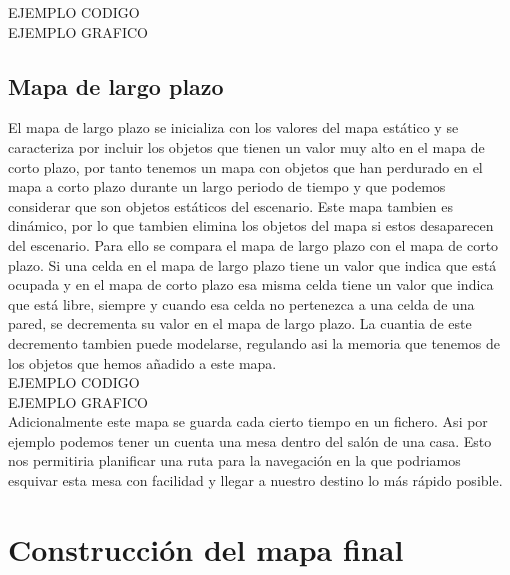 {EJEMPLO CODIGO}\\
{EJEMPLO GRAFICO}\\

\subsection{Mapa de largo plazo}
El mapa de largo plazo se inicializa con los valores del mapa estático y se caracteriza por incluir los objetos que tienen un valor muy alto en el mapa de corto plazo, por tanto tenemos un mapa con objetos que han perdurado en el mapa a corto plazo durante un largo periodo de tiempo y que podemos considerar que son objetos estáticos del escenario. 
Este mapa tambien es dinámico, por lo que tambien elimina los objetos del mapa si estos desaparecen del escenario. Para ello se compara el mapa de largo plazo con el mapa de corto plazo. Si una celda en el mapa de largo plazo tiene un valor que indica que está ocupada y en el mapa de corto plazo esa misma celda tiene un valor que indica que está libre, siempre y cuando esa celda no pertenezca a una celda de una pared, se decrementa su valor en el mapa de largo plazo. La cuantia de este decremento tambien puede modelarse, regulando asi la memoria que tenemos de los objetos que hemos añadido a este mapa.\\

{EJEMPLO CODIGO}\\
{EJEMPLO GRAFICO}\\

Adicionalmente este mapa se guarda cada cierto tiempo en un fichero. Asi por ejemplo podemos tener un cuenta una mesa dentro del salón de una casa. Esto nos permitiria planificar una ruta para la navegación en la que podriamos esquivar esta mesa con facilidad y llegar a nuestro destino lo más rápido posible.



\section{Construcción del mapa final}
\label{sec:construccionmap}

